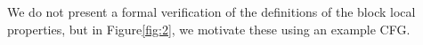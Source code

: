 We do not present a formal verification of the definitions of the block local
properties, but in Figure\ref{fig:2}, we motivate these using an example CFG.
\begin{figure}[htbp]
  \begin{center}
  
\end{center}
\end{figure}
